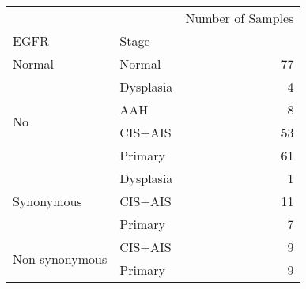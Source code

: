 \begin{tabular}{l|lr}
\toprule
               &         & Number of Samples \\
EGFR & Stage &                   \\
\midrule
Normal & Normal &                77 \\
\multirow{4}{*}{No} & Dysplasia &                 4 \\
               & AAH &                 8 \\
               & CIS+AIS &                53 \\
               & Primary &                61 \\
\cline{1-3}
\multirow{3}{*}{Synonymous} & Dysplasia &                 1 \\
               & CIS+AIS &                11 \\
               & Primary &                 7 \\
\cline{1-3}
\multirow{2}{*}{Non-synonymous} & CIS+AIS &                 9 \\
               & Primary &                 9 \\
\bottomrule
\end{tabular}
